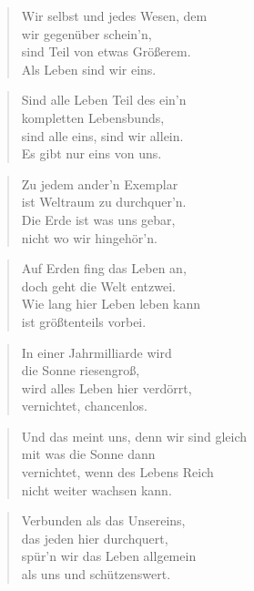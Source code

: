 \documentclass[10pt,a4paper]{article}
\begin{document}
\begin{paracol}{2}
\begin{verse}
Wir selbst und jedes Wesen, dem \\
wir gegenüber schein’n, \\
sind Teil von etwas Größerem. \\
Als Leben sind wir eins. \\
\end{verse}

\begin{verse}
Sind alle Leben Teil des ein’n \\
kompletten Lebensbunds, \\
sind alle eins, sind wir allein. \\
Es gibt nur eins von uns. \\
\end{verse}

\begin{verse}
Zu jedem ander’n Exemplar \\
ist Weltraum zu durchquer’n. \\
Die Erde ist was uns gebar, \\
nicht wo wir hingehör’n. \\
\end{verse}

\begin{verse}
Auf Erden fing das Leben an, \\
doch geht die Welt entzwei. \\
Wie lang hier Leben leben kann \\
ist größtenteils vorbei. \\
\end{verse}

\begin{verse}
In einer Jahrmilliarde wird \\
die Sonne riesengroß, \\
wird alles Leben hier verdörrt, \\
vernichtet, chancenlos. \\
\end{verse}

\begin{verse}
Und das meint uns, denn wir sind gleich \\
mit was die Sonne dann \\
vernichtet, wenn des Lebens Reich \\
nicht weiter wachsen kann. \\
\end{verse}

\begin{verse}
Verbunden als das Unsereins, \\
das jeden hier durchquert, \\
spür’n wir das Leben allgemein \\
als uns und schützenswert. \\
\end{verse}


\end{paracol}
\end{document}
